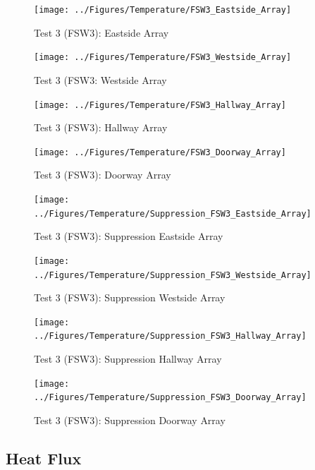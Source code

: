\documentclass[12pt,oneside]{book}
\begin{document}
\begin{figure}[!ht]
	\texttt{[image: ../Figures/Temperature/FSW3\_Eastside\_Array]}
	\caption{Test 3 (FSW3): Eastside Array}
	\label{fig:Test_3_Eastside_Array}
\end{figure}

\begin{figure}[!ht]
	\texttt{[image: ../Figures/Temperature/FSW3\_Westside\_Array]}
	\caption{Test 3 (FSW3: Westside Array}
	\label{fig:Test_3_Westside_Array}
\end{figure}

\begin{figure}[!ht]
	\texttt{[image: ../Figures/Temperature/FSW3\_Hallway\_Array]}
	\caption{Test 3 (FSW3): Hallway Array}
	\label{fig:Test_3_Hallway_Array}
\end{figure}

\begin{figure}[!ht]
	\texttt{[image: ../Figures/Temperature/FSW3\_Doorway\_Array]}
	\caption{Test 3 (FSW3): Doorway Array}
	\label{fig:Test_3_Doorway_Array}
\end{figure}

\begin{figure}[!ht]
	\texttt{[image: ../Figures/Temperature/Suppression\_FSW3\_Eastside\_Array]}
	\caption{Test 3 (FSW3): Suppression Eastside Array}
	\label{fig:Test_3_Suppression_Eastside_Array}
\end{figure}

\begin{figure}[!ht]
	\texttt{[image: ../Figures/Temperature/Suppression\_FSW3\_Westside\_Array]}
	\caption{Test 3 (FSW3): Suppression Westside Array}
	\label{fig:Test_3_Suppression_Westside_Array}
\end{figure}

\begin{figure}[!ht]
	\texttt{[image: ../Figures/Temperature/Suppression\_FSW3\_Hallway\_Array]}
	\caption{Test 3 (FSW3): Suppression Hallway Array}
	\label{fig:Test_3_Suppression_Hallway_Array}
\end{figure}

\begin{figure}[!ht]
	\texttt{[image: ../Figures/Temperature/Suppression\_FSW3\_Doorway\_Array]}
	\caption{Test 3 (FSW3): Suppression Doorway Array}
	\label{fig:Test_3_Suppression_Doorway_Array}
\end{figure}

\subsection{Heat Flux}
\label{subsec:Heat_Flux}
\end{document}
